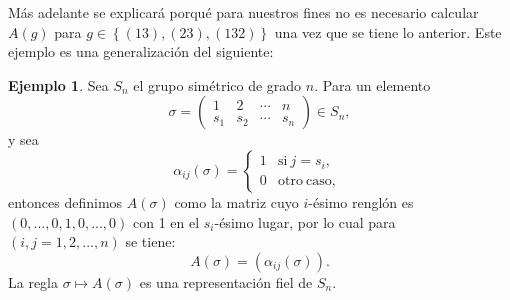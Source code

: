 \documentclass[12pt]{book}
\theoremstyle{definition}
\newtheorem{example}[theorem]{Ejemplo}
\newcounter{in}
\newcounter{ini}
\begin{document}
Más adelante se explicará porqué para nuestros fines no es necesario
calcular $A(g)$ para $g \in \left \{ (13),(23),(132) \right \}$ una
vez que se tiene lo anterior. Este ejemplo es una generalización del siguiente:


\begin{example}
  \label{Ej3}
  Sea $S_{n}$ el grupo simétrico de grado
  $n$. Para un elemento
  \begin{equation}
    \label{eq:1}
    \sigma =
    \begin{pmatrix}
      1 & 2 & \cdots  & n\\
      s_{1} & s_{2} & \cdots & s_{n}
    \end{pmatrix} 
    \in S_{n},
  \end{equation}
  y sea
  \begin{equation*}
    \alpha_{ij}\left(\sigma\right) = \left\{
      \begin{array}{ll}
        1      & \mathrm{si\ } j = s_{i}, \\
        0      & \mathrm{otro\ caso,\ } 
      \end{array}
    \right.
  \end{equation*}
  entonces definimos $A\left(\sigma\right)$ como la matriz cuyo
  $i$-ésimo renglón es $\left(0,...,0,1,0,...,0\right)$ con 1 en el
  $s_{i}$-ésimo lugar, por lo cual para $\left(i,j=1,2,...,n\right)$
  se tiene:
  \begin{equation*}
    A\left(\sigma\right) = \left(\alpha_{ij}\left(\sigma\right)\right).
  \end{equation*}
  La regla $\sigma \mapsto A\left(\sigma\right)$ es una representación
  fiel de $S_{n}$.
\end{example}
\end{document}
